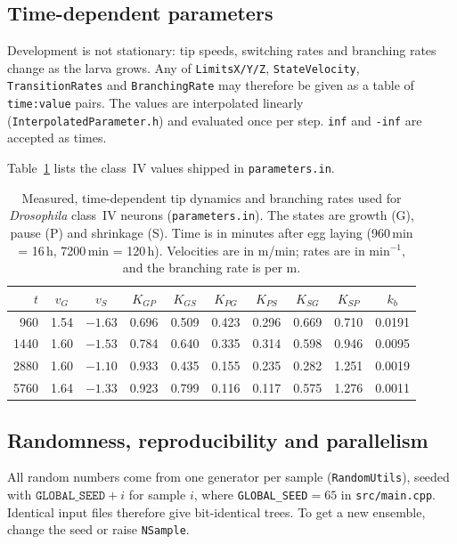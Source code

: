 \documentclass[11pt,a4paper]{article}
\newcommand{\code}[1]{\texttt{#1}}
\begin{document}
\FloatBarrier
\subsection{Time-dependent parameters}\label{sec:timedep}
Development is not stationary: tip speeds, switching rates and branching rates change as the larva grows. Any of \code{LimitsX/Y/Z}, \code{StateVelocity}, \code{TransitionRates} and \code{BranchingRate} may therefore be given as a table of \code{time:value} pairs. The values are interpolated linearly (\code{InterpolatedParameter.h}) and evaluated once per step. \code{inf} and \code{-inf} are accepted as times.

Table~\ref{tab:classiv} lists the class~IV values shipped in \code{parameters.in}.

\begin{table}[!htbp]
\centering\small
\caption{Measured, time-dependent tip dynamics and branching rates used for \emph{Drosophila} class~IV neurons (\code{parameters.in}). The states are growth (G), pause (P) and shrinkage (S). Time is in minutes after egg laying (960\,min = 16\,h, 7200\,min = 120\,h). Velocities are in \textmu m/min; rates are in min$^{-1}$, and the branching rate is per \textmu m.}
\label{tab:classiv}
\begin{tabular}{@{}rccccccccc@{}}
\toprule
$t$ & $v_G$ & $v_S$ & $K_{GP}$ & $K_{GS}$ & $K_{PG}$ & $K_{PS}$ & $K_{SG}$ & $K_{SP}$ & $k_b$\\
\midrule
960  & 1.54 & $-1.63$ & 0.696 & 0.509 & 0.423 & 0.296 & 0.669 & 0.710 & 0.0191\\
1440 & 1.60 & $-1.53$ & 0.784 & 0.640 & 0.335 & 0.314 & 0.598 & 0.946 & 0.0095\\
2880 & 1.60 & $-1.10$ & 0.933 & 0.435 & 0.155 & 0.235 & 0.282 & 1.251 & 0.0019\\
5760 & 1.64 & $-1.33$ & 0.923 & 0.799 & 0.116 & 0.117 & 0.575 & 1.276 & 0.0011\\
\bottomrule
\end{tabular}
\end{table}

\FloatBarrier
\subsection{Randomness, reproducibility and parallelism}
All random numbers come from one generator per sample (\code{RandomUtils}), seeded with $\texttt{GLOBAL\_SEED}+i$ for sample $i$, where \code{GLOBAL\_SEED}$=65$ in \code{src/main.cpp}. Identical input files therefore give bit-identical trees. To get a new ensemble, change the seed or raise \code{NSample}.
\end{document}
